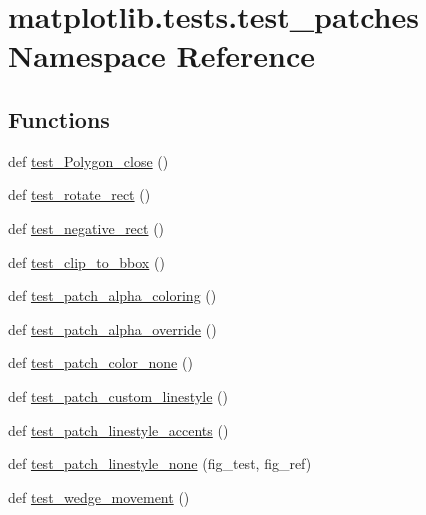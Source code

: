 \hypertarget{namespacematplotlib_1_1tests_1_1test__patches}{}\section{matplotlib.\+tests.\+test\+\_\+patches Namespace Reference}
\label{namespacematplotlib_1_1tests_1_1test__patches}
\subsection*{Functions}
\begin{DoxyCompactItemize}
\item 
def \hyperlink{namespacematplotlib_1_1tests_1_1test__patches_a24867c348b0d513710f352aa00a6caf7}{test\+\_\+\+Polygon\+\_\+close} ()
\item 
def \hyperlink{namespacematplotlib_1_1tests_1_1test__patches_a91bf4e44996526d217ac2794d8c59318}{test\+\_\+rotate\+\_\+rect} ()
\item 
def \hyperlink{namespacematplotlib_1_1tests_1_1test__patches_a82288364f19d9200006830b82927cc9f}{test\+\_\+negative\+\_\+rect} ()
\item 
def \hyperlink{namespacematplotlib_1_1tests_1_1test__patches_ac37592c58e6a316478c668ebbb8a73c4}{test\+\_\+clip\+\_\+to\+\_\+bbox} ()
\item 
def \hyperlink{namespacematplotlib_1_1tests_1_1test__patches_ad2abf7c458597240574df6895a28053a}{test\+\_\+patch\+\_\+alpha\+\_\+coloring} ()
\item 
def \hyperlink{namespacematplotlib_1_1tests_1_1test__patches_aa8a4d2c8c96c055a2d8daede715dd16f}{test\+\_\+patch\+\_\+alpha\+\_\+override} ()
\item 
def \hyperlink{namespacematplotlib_1_1tests_1_1test__patches_a3275ca134c9f5cc972f67ea26476644e}{test\+\_\+patch\+\_\+color\+\_\+none} ()
\item 
def \hyperlink{namespacematplotlib_1_1tests_1_1test__patches_a8db1e53bb966e9f356da8c19906286e9}{test\+\_\+patch\+\_\+custom\+\_\+linestyle} ()
\item 
def \hyperlink{namespacematplotlib_1_1tests_1_1test__patches_a403ddad6428567d3886d39f269ec836f}{test\+\_\+patch\+\_\+linestyle\+\_\+accents} ()
\item 
def \hyperlink{namespacematplotlib_1_1tests_1_1test__patches_a16562ffce7b8a2cab186818e3b46c9a9}{test\+\_\+patch\+\_\+linestyle\+\_\+none} (fig\+\_\+test, fig\+\_\+ref)
\item 
def \hyperlink{namespacematplotlib_1_1tests_1_1test__patches_ac942e200bd39f4eb69e5b84090e032db}{test\+\_\+wedge\+\_\+movement} ()

\end{DoxyCompactItemize}
